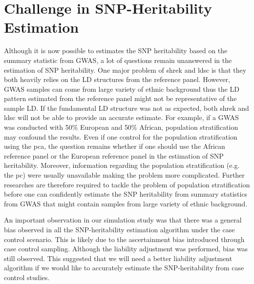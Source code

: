 \documentclass[12pt]{scrbook}
\begin{document}
	\section{Challenge in SNP-Heritability Estimation}
	Although it is now possible to estimates the \gls{SNP} heritability based on the summary statistic from \gls{GWAS}, a lot of questions remain unanswered in the estimation of \gls{SNP} heritability.
	One major problem of \gls{shrek} and \gls{ldsc} is that they both heavily relies on the \gls{LD} structures from the reference panel.
	However, \gls{GWAS} samples can come from large variety of ethnic background thus the \gls{LD} pattern estimated from the reference panel might not be representative of the sample \gls{LD}.
	If the fundamental \gls{LD} structure was not as expected, both \gls{shrek} and \gls{ldsc} will not be able to provide an accurate estimate. 
	For example, if a \gls{GWAS} was conducted with 50\% European and 50\% African, population stratification may confound the results.
	Even if one control for the population stratification using the \gls{pca}, the question remains whether if one should use the African reference panel or the European reference panel in the estimation of \gls{SNP} heritability.
	Moreover, information regarding the population stratification (e.g. the \gls{pc}) were usually unavailable making the problem more complicated.
	Further researches are therefore required to tackle the problem of population stratification before one can confidently estimate the \gls{SNP} heritability from summary statistics from \gls{GWAS} that might contain samples from large variety of ethnic background.
	
	An important observation in our simulation study was that there was a general bias observed in all the \gls{SNP}-heritability estimation algorithm under the case control scenario.
	This is likely due to the ascertainment bias introduced through case control sampling.
	Although the liability adjustment was performed, bias was still observed. 
	This suggested that we will need a better liability adjustment algorithm if we would like to accurately estimate the \gls{SNP}-heritability from case control studies.
	
\end{document}
